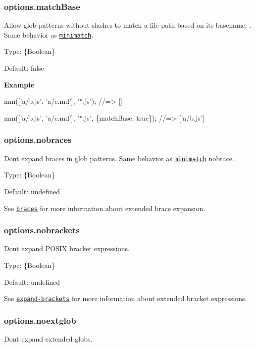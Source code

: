 \subsubsection*{options.\+match\+Base}

Allow glob patterns without slashes to match a file path based on its basename. . Same behavior as \href{https://github.com/isaacs/minimatch}{\tt minimatch}.

Type\+: {\ttfamily \{Boolean\}}

Default\+: {\ttfamily false}

{\bfseries Example}


\begin{DoxyCode}
mm(['a/b.js', 'a/c.md'], '*.js');
//=> []

mm(['a/b.js', 'a/c.md'], '*.js', \{matchBase: true\});
//=> ['a/b.js']
\end{DoxyCode}


\subsubsection*{options.\+nobraces}

Don\textquotesingle{}t expand braces in glob patterns. Same behavior as \href{https://github.com/isaacs/minimatch}{\tt minimatch} {\ttfamily nobrace}.

Type\+: {\ttfamily \{Boolean\}}

Default\+: {\ttfamily undefined}

See \href{https://github.com/jonschlinkert/braces}{\tt braces} for more information about extended brace expansion.

\subsubsection*{options.\+nobrackets}

Don\textquotesingle{}t expand P\+O\+S\+IX bracket expressions.

Type\+: {\ttfamily \{Boolean\}}

Default\+: {\ttfamily undefined}

See \href{https://github.com/jonschlinkert/expand-brackets}{\tt expand-\/brackets} for more information about extended bracket expressions.

\subsubsection*{options.\+noextglob}

Don\textquotesingle{}t expand extended globs.

